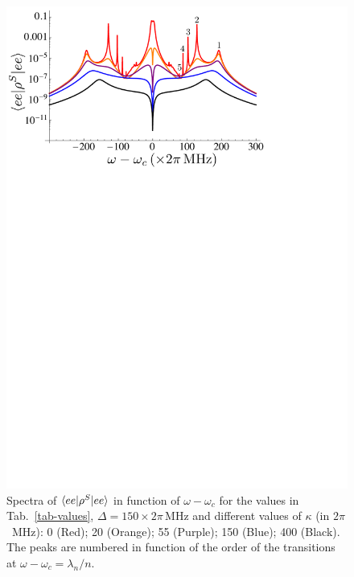 

\begin{figure}
\center
\includegraphics[width=0.75 \textwidth]{Images/chap5/ee_kappa.pdf}
\caption[ $\prodsc{ee}{\rho^S}{ee}$ in function of $\omega-\omega_c$]{ Spectra of $\prodsc{ee}{\rho^S}{ee}$ in function of $\omega-\omega_c$ for the values in Tab.~\ref{tab-values}, $\Delta=150 \times 2\pi\,\mbox{MHz}$ and different values of $\kappa$ (in $2\pi$~MHz): 0 (Red); 20 (Orange); 55 (Purple); 150 (Blue); 400 (Black). The peaks are numbered in function of the order of the transitions at $\omega-\omega_c=\lambda_n/n$. }
\label{fig-ee_kappa}
\end{figure}

